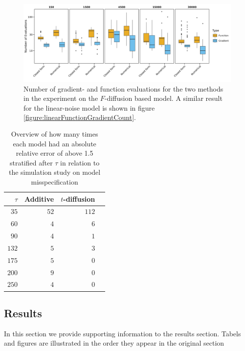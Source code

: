 \begin{figure}[h!]
    \begin{center}
    \includegraphics[scale = .08]{figures/function_gradient_count_F_plot.jpeg}     
    \caption{Number of gradient- and function evaluations for the two methods in the experiment on the $F$-diffusion based model. A similar result for the linear-noise model is shown in figure \ref{figure:linearFunctionGradientCount}.}
    \label{figure:FFunctionGradientCount}   
    \end{center}
\end{figure}
\begin{table}[h!]
    \centering
    \begin{tabular}{rrrr}
    $\tau$ & Additive & $t$-diffusion \\ 
      \hline
      $35$ &  $52$ & $112$ \\ 
      $60$ &   $4$ & $6$ \\ 
      $90$ &   $4$ & $1$ \\ 
      $132$ &  $5$ & $3$ \\ 
      $175$ &  $5$ & $0$ \\ 
      $200$ &  $9$ & $0$ \\ 
      $250$ &  $4$ & $0$ \\ 
       \hline
    \end{tabular}
    \caption{Overview of how many times each model had an absolute relative error of above 1.5 stratified after $\tau$ in relation to the simulation study on model misspecification}
    \label{table:AREabove1.5tauSim}
    \end{table}
\newpage
    \subsection{Results}
    In this section we provide supporting information to the results section. Tabels and figures are illustrated in the order they appear in the original section

